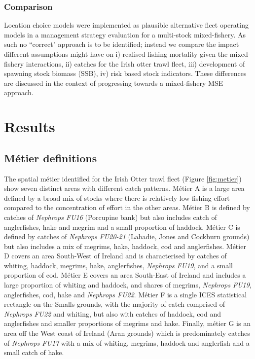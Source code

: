 \documentclass[12pt, halfline, a4paper]{ouparticle}
\begin{document}
\subsubsection{Comparison}

Location choice models were implemented as plausible alternative fleet
operating models in a management strategy evaluation for a multi-stock
mixed-fishery. As such no ``correct" approach is to be identified; instead we
compare the impact different assumptions might have on i) realised fishing
mortality given the mixed-fishery interactions, ii) catches for the Irish otter
trawl fleet, iii) development of spawning stock biomass (SSB), iv) risk based
stock indicators. These differences are discussed in the context of progressing
towards a mixed-fishery MSE approach.

\section{Results}
\label{res}

\subsection{Métier definitions}

The spatial métier identified for the Irish Otter trawl fleet (Figure
\ref{fig:metier}) show seven distinct areas with different catch patterns.
Métier A is a large area defined by a broad mix of stocks where there is
relatively low fishing effort compared to the concentration of effort in the
other areas. Métier B is defined by catches of \textit{Nephrops FU16}
(Porcupine bank) but also includes catch of anglerfishes, hake and megrim and a
small proportion of haddock. Métier C is defined by catches of \textit{Nephrops
	FU20-21} (Labadie, Jones and Cockburn grounds) but also includes a mix
of megrims, hake, haddock, cod and anglerfishes. Métier D covers an area
South-West of Ireland and is characterised by catches of whiting, haddock,
megrims, hake, anglerfishes, \textit{Nephrops FU19}, and a small proportion of
cod. Métier E covers an area South-East of Ireland and includes a large
proportion of whiting and haddock, and shares of megrims, \textit{Nephrops
	FU19}, anglerfishes, cod, hake and \textit{Nephrops FU22}.  Métier F is
a single ICES statistical rectangle on the Smalls grounds, with the majority of
catch comprised of \textit{Nephrops FU22} and whiting, but also with catches of
haddock, cod and anglerfishes and smaller proportions of megrims and hake.
Finally, métier G is an area off the West coast of Ireland (Aran grounds) which
is predominately catches of \textit{Nephrops FU17} with a mix of whiting,
megrims, haddock and anglerfish and a small catch of hake.
\end{document}
